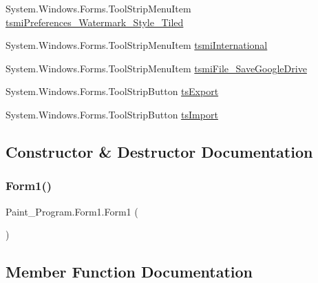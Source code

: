 \begin{DoxyCompactItemize}
System.\+Windows.\+Forms.\+Tool\+Strip\+Menu\+Item \mbox{\hyperlink{class_paint___program_1_1_form1_a34b8fb763b018948910a3a57cdef5008}{tsmi\+Preferences\+\_\+\+Watermark\+\_\+\+Style\+\_\+\+Tiled}}
\item 
System.\+Windows.\+Forms.\+Tool\+Strip\+Menu\+Item \mbox{\hyperlink{class_paint___program_1_1_form1_a3ef1157808559cef1fe8f20c37a0ea67}{tsmi\+International}}
\item 
System.\+Windows.\+Forms.\+Tool\+Strip\+Menu\+Item \mbox{\hyperlink{class_paint___program_1_1_form1_a2f5cdb425d393468ba85249be3396b4b}{tsmi\+File\+\_\+\+Save\+Google\+Drive}}
\item 
System.\+Windows.\+Forms.\+Tool\+Strip\+Button \mbox{\hyperlink{class_paint___program_1_1_form1_a1798dbbfeb9fe2269f5df600fac8a131}{ts\+Export}}
\item 
System.\+Windows.\+Forms.\+Tool\+Strip\+Button \mbox{\hyperlink{class_paint___program_1_1_form1_afa314201f3d656409b0ee3d71b72d87b}{ts\+Import}}
\end{DoxyCompactItemize}


\subsection{Constructor \& Destructor Documentation}
\mbox{\label{class_paint___program_1_1_form1_aefb0d3ee7baac9f44e9d742615ec526d}} 
\subsubsection{\texorpdfstring{Form1()}{Form1()}}
{\footnotesize\ttfamily Paint\+\_\+\+Program.\+Form1.\+Form1 (\begin{DoxyParamCaption}{ }\end{DoxyParamCaption})\hspace{0.3cm}{\ttfamily [inline]}}



\subsection{Member Function Documentation}
\mbox{\label{class_paint___program_1_1_form1_a95401dd65c21b5064231e937fa2f1c76}} 
